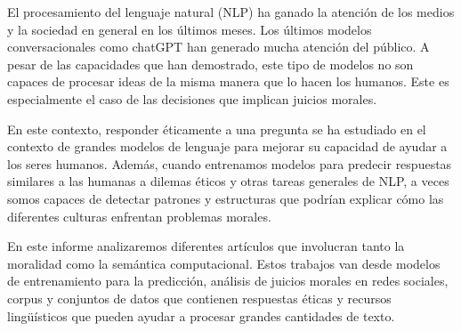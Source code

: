 \documentclass[
	spanish, %
	letterpaper, oneside
]{article}
\begin{document}
	
\templatePagecfg

\templateFinalcfg


\inserttitle



El procesamiento del lenguaje natural (NLP) ha ganado la atención de los medios y la sociedad en general en los últimos meses. Los últimos modelos conversacionales como chatGPT han generado mucha atención del público. A pesar de las capacidades que han demostrado, este tipo de modelos no son capaces de procesar ideas de la misma manera que lo hacen los humanos. Este es especialmente el caso de las decisiones que implican juicios morales.

\newp En este contexto, responder éticamente a una pregunta se ha estudiado en el contexto de grandes modelos de lenguaje para mejorar su capacidad de ayudar a los seres humanos. Además, cuando entrenamos modelos para predecir respuestas similares a las humanas a dilemas éticos y otras tareas generales de NLP, a veces somos capaces de detectar patrones y estructuras que podrían explicar cómo las diferentes culturas enfrentan problemas morales.

\newp En este informe analizaremos diferentes artículos que involucran tanto la moralidad como la semántica computacional. Estos trabajos van desde modelos de entrenamiento para la predicción, análisis de juicios morales en redes sociales, corpus y conjuntos de datos que contienen respuestas éticas y recursos lingüísticos que pueden ayudar a procesar grandes cantidades de texto.
\end{document}
